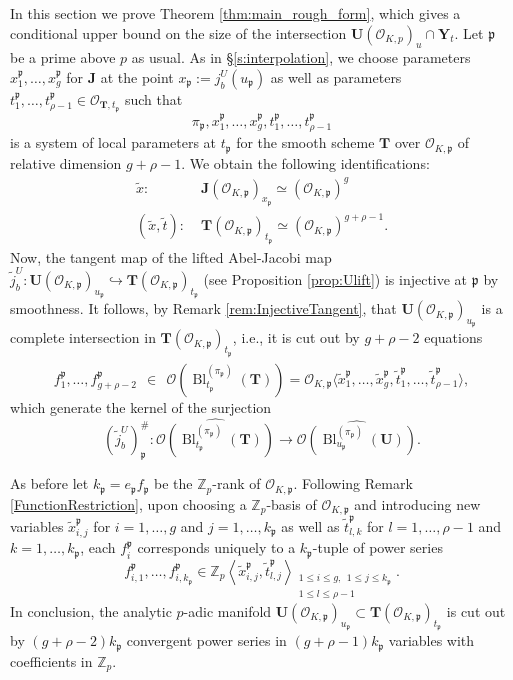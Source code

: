 \documentclass[11pt,oneside]{amsart}
\theoremstyle{plain}
\theoremstyle{definition}
\def\lra{{\longrightarrow}}
\DeclareMathOperator{\Bl}{Bl}
\def\fp{\mathfrak{p}}
\def\TT{\mathbf{T}}
\def\Z{\mathbb{Z}}
\def\J{\mathbf{J}}
\def\U{\mathbf{U}}
\def\Y{\mathbf{Y}}
\def\oh{\mathcal{O}}
\begin{document}
In this section we prove Theorem \ref{thm:main_rough_form}, which gives a conditional upper bound on the size of the intersection $\U(\oh_{K, p})_u\cap \Y_t$.
Let $\mathfrak{p}$ be a prime above $p$ as usual. As in \S \ref{s:interpolation}, we choose parameters $x_1^{\fp}, \ldots, x_g^{\fp}$ for $\J$ at the point $x_\fp:=j_b^U(u_\fp)$ as well as parameters $t_1^{\fp}, \ldots, t_{\rho-1}^{\fp}\in \oh_{\TT, t_{\fp}}$ such that 
$$\pi_{\fp}, x_1^{\fp}, \ldots, x_g^{\fp}, t_1^{\fp}, \ldots, t_{\rho-1}^{\fp}$$ is a system of local parameters at $t_\fp$ for the smooth scheme $\TT$ over $\oh_{K, \fp}$ of relative dimension $g+\rho-1$. 
We obtain the following identifications:
\begin{align*}
\tilde{x} :  \;& \J(\oh_{K, \fp})_{x_\fp} \simeq (\oh_{K, \fp})
^g \\ 
(\tilde{x}, \tilde{t}) : \; &\TT(\oh_{K, \fp})_{t_\fp} \simeq (\oh_{K, \fp})
^{g+\rho-1}. 
\end{align*}
Now, the tangent map of the lifted Abel-Jacobi map $\tilde{j}_b^U : \U(\oh_{K,\fp})_{u_\fp}\hookrightarrow \TT(\oh_{K, \fp})_{t_\fp}$ (see Proposition \ref{prop:Ulift}) is injective at $\fp$ by smoothness. It follows, by Remark \ref{rem:InjectiveTangent}, that $\U(\oh_{K, \fp})_{u_\fp}$ is a complete intersection in $\TT(\oh_{K,\mathfrak{p}})_{t_{\mathfrak{p}}}$, i.e., it is cut out by $g+\rho-2$ equations
\[
f_1^{\fp}, \ldots, f_{g+\rho-2}^{\fp} \:\: \in \:\: \widehat{\oh(\Bl_{t_\fp}^{(\pi_{\fp})}(\TT))}=\oh_{K,\fp}\langle \tilde{x}_1^{\fp}, \ldots, \tilde{x}_g^{\fp}, \tilde{t}_1^{\fp}, \ldots, \tilde{t}_{\rho-1}^{\fp} \rangle,
\]
which generate the kernel of the surjection 
$$(\tilde{j}^U_b)^{\#}_{\fp} : \widehat{\oh(\Bl_{t_\fp}^{(\pi_{\fp})}(\TT))}\lra \widehat{\oh(\Bl_{u_\fp}^{(\pi_{\fp})}(\U))}.$$

As before let $k_{\fp}=e_{\fp}f_{\fp}$ be the $\Z_p$-rank of $\oh_{K, \fp}$. Following Remark \ref{FunctionRestriction}, upon choosing a $\Z_p$-basis of $\oh_{K, \fp}$ and introducing new variables $\tilde{x}_{i, j}^{\fp}$ for $i=1, \ldots, g$ and $j=1, \ldots, k_{\fp}$ as well as $\tilde{t}_{l,k}^{\fp}$ for $l=1, \ldots, \rho-1$ and $k=1, \ldots, k_{\fp}$, each $f_i^{\fp}$ corresponds uniquely to a $k_{\fp}$-tuple of power series 
\[
f_{i,1}^{\fp}, \ldots, f_{i, k_\fp}^{\fp} \in \Z_p\left\langle \tilde{x}_{i, j}^{\fp}, \tilde{t}_{l, j}^{\fp}
\right\rangle_{\substack{ 1\leq i\leq g, \:\:
    1\leq j\leq k_{\fp} \\
    1\leq l\leq \rho-1 \: \qquad  }}. 
\]
In conclusion, the analytic $p$-adic manifold $\U(\oh_{K,\fp})_{u_{\fp}}\subset \TT(\oh_{K,\fp})_{t_{\fp}}$ is cut out by $(g+\rho-2)k_\fp$ convergent power series in $(g+\rho-1)k_\fp$ variables with coefficients in $\Z_p$.
\end{document}
